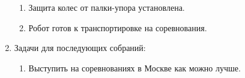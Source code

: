 \begin{enumerate}
\begin{enumerate}
		\item Защита колес от палки-упора установлена.
		
		\item Робот готов к транспортировке на соревнования.
		
	\end{enumerate}
	
	\item Задачи для последующих собраний:
	\begin{enumerate}
		
		\item Выступить на соревнованиях в Москве как можно лучше.
			
	\end{enumerate}
\end{enumerate}
\fillpage
